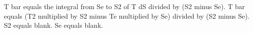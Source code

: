 T bar equals the integral from Se to S2 of T dS divided by (S2 minus Se).  
T bar equals (T2 multiplied by S2 minus Te multiplied by Se) divided by (S2 minus Se).  
S2 equals blank.  
Se equals blank.